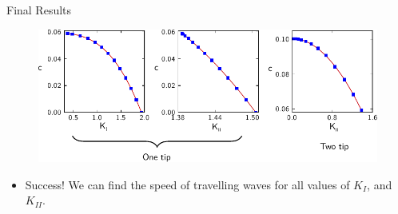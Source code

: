 \documentclass{beamer}
\begin{document}
\begin{frame}{Final Results}
\begin{figure}
  \centerline{\includegraphics[scale=0.7]{overall-fit.pdf}}
\end{figure}
\begin{itemize}
\item Success! We can find the speed of travelling waves for all values of
      $K_I$, and $K_{II}$.
\end{itemize}
\end{frame}
\end{document}
